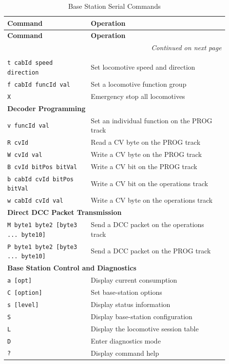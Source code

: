 \begin{longtable}{@{}|p{0.34\linewidth}|p{0.56\linewidth}|@{}}
\caption{Base Station Serial Commands} \\
\toprule
\textbf{Command} & \textbf{Operation} \\
\midrule
\endfirsthead

\toprule
\textbf{Command} & \textbf{Operation} \\
\midrule
\endhead

\midrule
\multicolumn{2}{r}{\textit{Continued on next page}} \\
\midrule
\endfoot

\bottomrule
\endlastfoot

\multicolumn{2}{|l|}{\textbf{Locomotive Control}} \\
\texttt{t cabId speed direction} & Set locomotive speed and direction \\
\texttt{f cabId funcId val} & Set a locomotive function group \\
\texttt{X} & Emergency stop all locomotives \\
\midrule

\multicolumn{2}{|l|}{\textbf{Decoder Programming}} \\
\texttt{v funcId val} & Set an individual function on the PROG track \\
\texttt{R cvId} & Read a CV byte on the PROG track \\
\texttt{W cvId val} & Write a CV byte on the PROG track \\
\texttt{B cvId bitPos bitVal} & Write a CV bit on the PROG track \\
\texttt{b cabId cvId bitPos bitVal} & Write a CV bit on the operations track \\
\texttt{w cabId cvId val} & Write a CV byte on the operations track \\
\midrule

\multicolumn{2}{|l|}{\textbf{Direct DCC Packet Transmission}} \\
\texttt{M byte1 byte2 [byte3 ... byte10]} & Send a DCC packet on the operations track \\
\texttt{P byte1 byte2 [byte3 ... byte10]} & Send a DCC packet on the PROG track \\
\midrule

\multicolumn{2}{|l|}{\textbf{Base Station Control and Diagnostics}} \\
\texttt{a [opt]} & Display current consumption \\
\texttt{C [option]} & Set base-station options \\
\texttt{s [level]} & Display status information \\
\texttt{S} & Display base-station configuration \\
\texttt{L} & Display the locomotive session table \\
\texttt{D} & Enter diagnostics mode \\
\texttt{?} & Display command help \\

\end{longtable}


